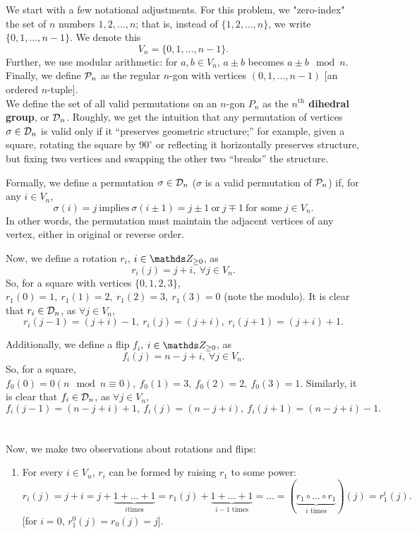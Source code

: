 \documentclass{homework}
\begin{document}
\begin{solution}
  We start with a few notational adjustments. For this problem, we "zero-index" the set of $n$
  numbers $1,2,\ldots,n$; that is, instead of $\{ 1,2,\ldots,n \}$, we write $\{ 0,1,\ldots,n-1 \}$.
  We denote this \[ V_n=\{0,1,\ldots,n-1\} .\]
  Further, we use modular arithmetic: for $a,b\in V_n$, $a\pm b$ becomes $a\pm b\mod{n}$. \\
  Finally, we define $\mathcal{P}_n$ as the regular $n$-gon with vertices $(0,1,\ldots,n-1)$ [an ordered
  $n$-tuple].\\

  We define the set of all valid permutations on an $n$-gon $P_n$ as the \textbf{$n^{\text{th}}$ 
  dihedral group}, or $\mathcal{D}_n$. Roughly, we get the intuition that any permutation of vertices
  $\sigma\in \mathcal{D}_n$ is valid only if it ``preserves geometric structure;'' for example, given a
  square, rotating the square by $90^{\circ}$ or reflecting it horizontally preserves structure, but
  fixing two vertices and swapping the other two ``breaks'' the structure.

  Formally, we define a permutation $\sigma\in \mathcal{D}_n$ ($ \sigma $ is a valid permutation of $\mathcal{P}_n$)
  if, for any $i\in V_n$, \[
    \sigma(i)=j ~\text{implies}~\sigma(i\pm 1)=j\pm 1 ~\text{or}~j\mp 1~\text{for some}~j\in V_n
  .\] In other words, the permutation must maintain the adjacent vertices of any vertex, either in
  original or reverse order.

  Now, we define a rotation $r_i$, $i\in \Z_{\ge 0}$, as \[
    r_i(j)=j+i,\ \forall j\in V_n
  .\] So, for a square with vertices $\{ 0,1,2,3 \}$, $ r_1(0)=1,\ r_1(1)=2,\ r_1(2)=3,\ r_1(3)=0$
  (note the modulo). It is clear that $r_i\in \mathcal{D}_n$, as $\forall j\in V_n$, \[
    r_i(j-1)=(j+i)-1,\ r_i(j)=(j+i),\ r_i(j+1)=(j+i)+1
  .\]

  Additionally, we define a flip $f_i$, $i\in \Z_{\ge 0}$, as \[
    f_i(j)=n-j+i,\ \forall j\in V_n
  .\] So, for a square, $ f_0(0)=0 (n\mod{n}\equiv 0),\ f_0(1)=3,\ f_0(2)=2,\ f_0(3)=1$. Similarly,
  it is clear that $f_i\in \mathcal{D}_n$, as $\forall j\in V_n$, \[
    f_i(j-1)=(n-j+i)+1,\ f_i(j)=(n-j+i),\ f_i(j+1)=(n-j+i)-1
  .\] \\ \\
  Now, we make two observations about rotations and flips:
  \begin{enumerate}
    \item 
      For every $i\in V_n$, $r_i$ can be formed by raising $r_1$ to some power: \[
        r_i(j)= j+i=j+\underbrace{1+\ldots+1}_{\text{$i$
        times}}=r_1(j)+\underbrace{1+\ldots+1}_{\text{$i-1$ times}} = \ldots=(\underbrace{r_1\circ \ldots\circ
      r_1}_{\text{$i$ times}})(j) = r_1^{i}(j)
      .\] [for $i=0$, $ r_1^0(j)=r_0(j)=j$].


\end{enumerate}
\end{solution}
\end{document}
